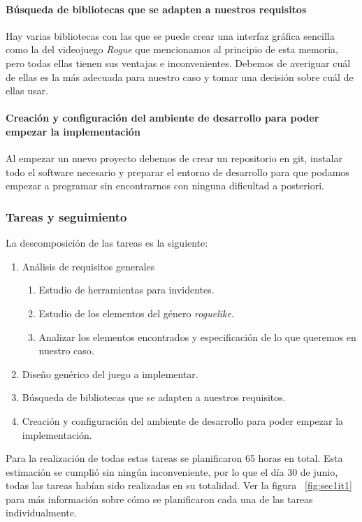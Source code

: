 \paragraph{Búsqueda de bibliotecas que se adapten a nuestros requisitos} Hay varias bibliotecas con las que se puede crear una interfaz gráfica sencilla como la del videojuego \textit{Rogue} que mencionamos al principio de esta memoria, pero todas ellas tienen sus ventajas e inconvenientes. Debemos de averiguar cuál de ellas es la más adecuada para nuestro caso y tomar una decisión sobre cuál de ellas usar.

\paragraph{Creación y configuración del ambiente de desarrollo para poder empezar la implementación} Al empezar un nuevo proyecto debemos de crear un repositorio en git, instalar todo el software necesario y preparar el entorno de desarrollo para que podamos empezar a programar sin encontrarnos con ninguna dificultad a posteriori.

\subsubsection{Tareas y seguimiento}

La descomposición de las tareas es la siguiente:

\begin{enumerate}[label=\bfseries WBS 1.\arabic*]
  \item Análisis de requisitos generales
    \begin{enumerate}[label=\bfseries WBS 1.1.\arabic*]
      \item Estudio de herramientas para invidentes.
      \item Estudio de los elementos del género \textit{roguelike}.
      \item Analizar los elementos encontrados y especificación de lo que queremos en nuestro caso.
    \end{enumerate}
  \item Diseño genérico del juego a implementar.
  \item Búsqueda de bibliotecas que se adapten a nuestros requisitos.
  \item Creación y configuración del ambiente de desarrollo para poder empezar la implementación.
\end{enumerate}

Para la realización de todas estas tareas se planificaron 65 horas en total. Esta estimación se cumplió sin ningún inconveniente, por lo que el día 30 de junio, todas las tareas habían sido realizadas en su totalidad. Ver la figura ~\ref{fig:sec1it1} para más información sobre cómo se planificaron cada una de las tareas individualmente.

